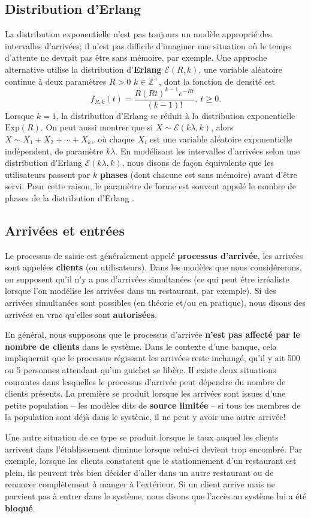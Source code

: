 \subsection{Distribution d'Erlang}
La distribution exponentielle n'est pas toujours un modèle approprié des intervalles d’arrivées; il n’est pas difficile d’imaginer une situation où le temps d’attente ne devrait pas être sans mémoire, par exemple. Une approche alternative utilise la distribution d'\textbf{Erlang} $\mathcal{E}(R,k)$, une variable aléatoire continue à deux paramètres $R>0$  $k\in \mathbb{Z}^+$,  dont la fonction de densité est  
$$ f_{R,k}(t) = \frac{R (Rt)^{k-1} e^{-Rt}}{(k-1)!},\ t\geq 0.$$
Lorsque $k=1$, la distribution d'Erlang se r\'eduit \`a la distribution exponentielle $\text{Exp}(R)$. On peut aussi montrer que si $X\sim \mathcal{E}(k\lambda,k)$, alors $X\sim X_{1}+X_{2}+\cdots+X_{k},$ o\`u chaque $X_{i}$ est une variable al\'eatoire exponentielle ind\'ependent, de param\`etre $k \lambda$. \newl En modélisant les intervalles d’arrivées selon une distribution d’Erlang $\mathcal{E}(k\lambda,k)$, nous disons de façon équivalente que les utilisateurs passent par $k$ \textbf{phases} (dont chacune est sans mémoire) avant d'être servi. Pour cette raison, le paramètre de forme est souvent appelé le nombre de phases de la distribution d'Erlang \cite{QS_N}.
\subsection{Arriv\'ees et entr\'ees}
Le processus de saisie est généralement appelé \textbf{processus d’arrivée}, les arrivées sont appelées \textbf{clients} (ou utilisateurs). Dans les modèles que nous considérerons, on supposent qu’il n’y a pas d'arrivées simultanées (ce qui peut être irréaliste lorsque l'on modélise les arrivées dans un restaurant, par exemple). Si des arrivées simultanées sont possibles (en théorie et/ou en pratique), nous disons des arrivées en vrac qu'elles sont \textbf{autorisées}. 
\par En général, nous supposons que le processus d'arrivée \textbf{n’est pas affecté par le nombre de clients} dans le système. Dans le contexte d'une banque, cela impliquerait que le processus régissant les arrivées reste inchangé, qu'il y ait 500 ou 5 personnes attendant qu’un guichet se libère. 
\newl Il existe deux situations courantes dans lesquelles le processus d'arrivée peut dépendre du nombre de clients présents. La première se produit lorsque les arrivées sont issues d'une petite population -- les modèles dits de \textbf{source limitée} -- si tous les membres de la population sont déjà dans le système, il ne peut y avoir une autre arrivée!\par Une autre situation de ce type se produit lorsque le taux auquel les clients arrivent dans l'établissement diminue lorsque celui-ci devient trop encombré. Par exemple, lorsque les clients constatent que le stationnement d'un restaurant est plein, ils peuvent très bien décider d'aller dans un autre restaurant ou de renoncer complètement à manger à l'extérieur. Si un client arrive mais ne parvient pas à entrer dans le système, nous disons que l'acc\`es au syst\`eme lui a \'et\'e \textbf{bloqu\'e}.
